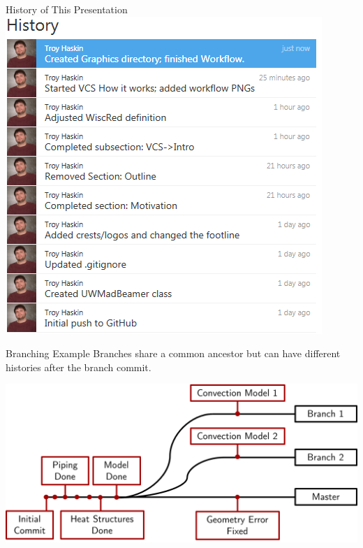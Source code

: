 \documentclass[10pt,t,xcolor=table]{UWMadBeamer}
\begin{document}
    \begin{frame}{History of This Presentation}
        \centering
        \includegraphics[scale=0.40]{VCSHistoryExample}
    \end{frame}

    \begin{frame}[c]{Branching Example}
        Branches share a common ancestor but can have different histories after the branch commit.

        {
            \centering
            \includegraphics[scale=0.52]{BranchExample}
        }
    \end{frame}
\end{document}

